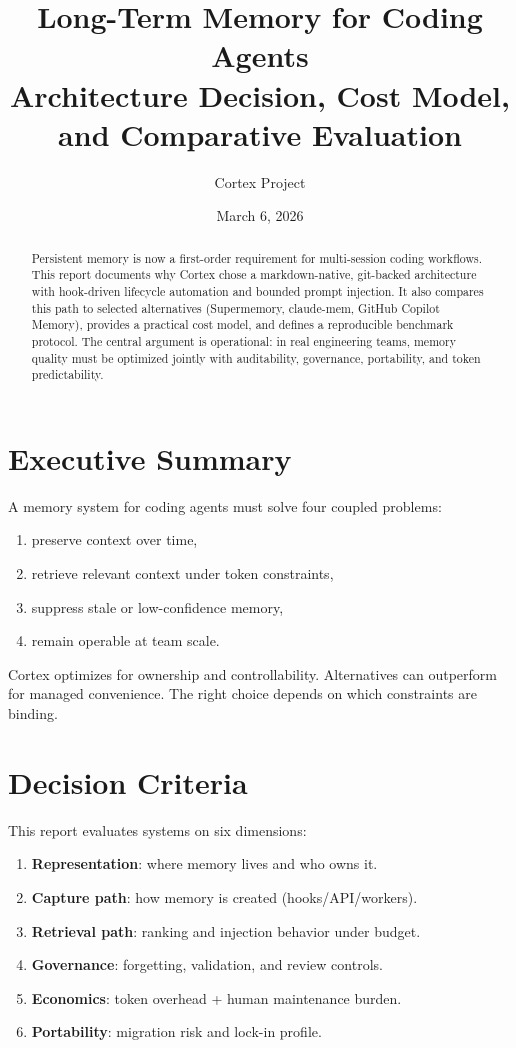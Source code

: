 \documentclass[10pt,twocolumn]{article}
\title{\vspace{-1.2em}Long-Term Memory for Coding Agents\\
\large Architecture Decision, Cost Model, and Comparative Evaluation}
\author{Cortex Project}
\date{March 6, 2026}
\begin{document}
\maketitle

\begin{abstract}
Persistent memory is now a first-order requirement for multi-session coding workflows. This report documents why Cortex chose a markdown-native, git-backed architecture with hook-driven lifecycle automation and bounded prompt injection. It also compares this path to selected alternatives (Supermemory, claude-mem, GitHub Copilot Memory), provides a practical cost model, and defines a reproducible benchmark protocol. The central argument is operational: in real engineering teams, memory quality must be optimized jointly with auditability, governance, portability, and token predictability.
\end{abstract}

\section{Executive Summary}
A memory system for coding agents must solve four coupled problems:
\begin{enumerate}
  \item preserve context over time,
  \item retrieve relevant context under token constraints,
  \item suppress stale or low-confidence memory,
  \item remain operable at team scale.
\end{enumerate}

Cortex optimizes for ownership and controllability. Alternatives can outperform for managed convenience. The right choice depends on which constraints are binding.

\section{Decision Criteria}
This report evaluates systems on six dimensions:
\begin{enumerate}
  \item \textbf{Representation}: where memory lives and who owns it.
  \item \textbf{Capture path}: how memory is created (hooks/API/workers).
  \item \textbf{Retrieval path}: ranking and injection behavior under budget.
  \item \textbf{Governance}: forgetting, validation, and review controls.
  \item \textbf{Economics}: token overhead + human maintenance burden.
  \item \textbf{Portability}: migration risk and lock-in profile.
\end{enumerate}
\end{document}
